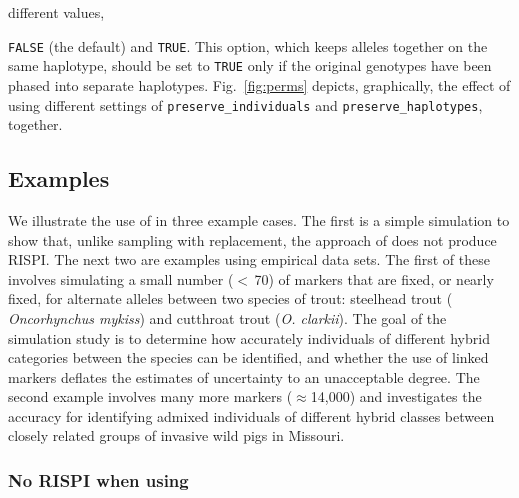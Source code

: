 different values, {{\tt\footnotesize FALSE} (the default) and {\tt\footnotesize TRUE}.
This option, which keeps alleles together
on the same haplotype, should be set to {\tt TRUE} only
if the original genotypes have been phased into separate haplotypes.
Fig.~\ref{fig:perms} depicts, graphically, the effect of using different settings of
{\tt\footnotesize preserve\_individuals} and 
{\tt\footnotesize preserve\_haplotypes}, together.


%

\subsection*{Examples}

We illustrate the use of \gscramble{} in three example cases. The first is
a simple simulation to show that, unlike sampling with replacement, the
approach of \gscramble{} does not produce RISPI.
The next two are examples using empirical data sets.
The first of these involves
simulating a small number ($<\,$70) of markers that are fixed, or nearly
fixed, for alternate alleles between two species of trout: steelhead trout ({\em 
Oncorhynchus mykiss}) and cutthroat trout ({\em O. clarkii}). The goal of the 
simulation study is to determine how accurately individuals of different hybrid
categories between the species can be identified, and whether the use of linked 
markers deflates the estimates of uncertainty to an unacceptable degree.  The 
second example involves many more markers ($\approx$14,000) and 
investigates the accuracy for
identifying admixed individuals of different hybrid classes between 
closely related groups of invasive wild 
pigs in Missouri.  

\subsubsection*{No RISPI when using \gscramble{}}

}
